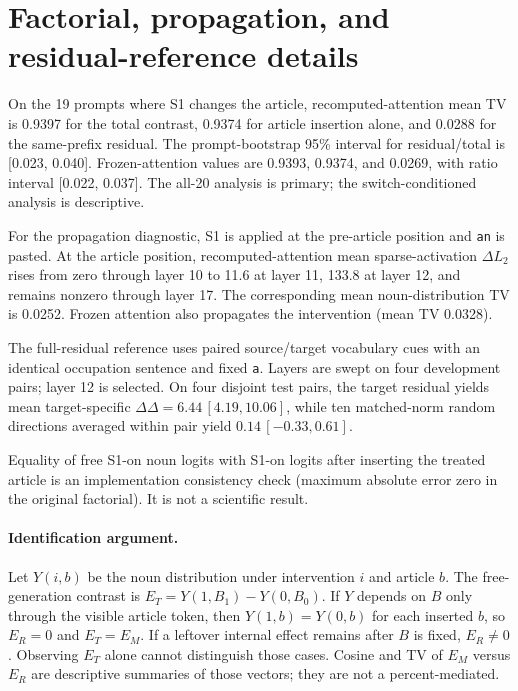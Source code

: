 \section{Factorial, propagation, and residual-reference details}
\label{app:factorial-details}

On the 19 prompts where S1 changes the article, recomputed-attention mean
TV is 0.9397 for the total contrast, 0.9374 for article insertion alone,
and 0.0288 for the same-prefix residual. The prompt-bootstrap 95\%
interval for residual/total is [0.023, 0.040]. Frozen-attention values are
0.9393, 0.9374, and 0.0269, with ratio interval [0.022, 0.037].
The all-20 analysis is primary; the switch-conditioned analysis is
descriptive.

For the propagation diagnostic, S1 is applied at the pre-article position
and \texttt{an} is pasted. At the article position, recomputed-attention
mean sparse-activation \(\Delta L_2\) rises from zero through layer 10 to
11.6 at layer 11, 133.8 at layer 12, and remains nonzero through layer 17.
The corresponding mean noun-distribution TV is 0.0252. Frozen attention
also propagates the intervention (mean TV 0.0328).

The full-residual reference uses paired source/target vocabulary cues with
an identical occupation sentence and fixed \texttt{a}. Layers are swept on
four development pairs; layer 12 is selected. On four disjoint test pairs,
the target residual yields mean target-specific
\(\Delta\Delta=6.44\,[4.19,10.06]\), while ten matched-norm random
directions averaged within pair yield \(0.14\,[-0.33,0.61]\).

Equality of free S1-on noun logits with S1-on logits after inserting the
treated article is an implementation consistency check (maximum absolute
error zero in the original factorial). It is not a scientific result.

\paragraph{Identification argument.}
Let \(Y(i,b)\) be the noun distribution under intervention \(i\) and
article \(b\). The free-generation contrast is
\(E_T=Y(1,B_1)-Y(0,B_0)\). If \(Y\) depends on \(B\) only through the
visible article token, then \(Y(1,b)=Y(0,b)\) for each inserted \(b\), so
\(E_R=0\) and \(E_T=E_M\). If a leftover internal effect remains after
\(B\) is fixed, \(E_R\neq 0\). Observing \(E_T\) alone cannot distinguish
those cases. Cosine and TV of \(E_M\) versus \(E_R\) are descriptive
summaries of those vectors; they are not a percent-mediated.


